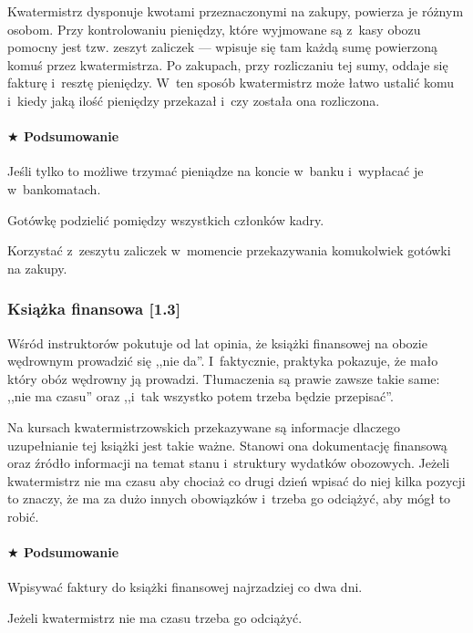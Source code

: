 \documentclass[a5paper,10pt,titlepage,twoside]{article}
\newcommand*{\thecheckbox}{\hss$\Box$} %
\newenvironment*{checklist}
{\list{}{%
\renewcommand*{\makelabel}[1]{\thecheckbox}}}
{\endlist}
\begin{document}
Kwatermistrz dysponuje kwotami przeznaczonymi na zakupy, powierza je różnym osobom. Przy kontrolowaniu pieniędzy, które wyjmowane są z~kasy obozu pomocny jest tzw. zeszyt zaliczek --- wpisuje się tam każdą sumę powierzoną komuś przez kwatermistrza. Po zakupach, przy rozliczaniu tej sumy, oddaje się fakturę i~resztę pieniędzy. W~ten sposób kwatermistrz może łatwo ustalić komu i~kiedy jaką ilość pieniędzy przekazał i~czy została ona rozliczona.
\paragraph{$\bigstar$ Podsumowanie}
\begin{checklist}
\item Jeśli tylko to możliwe trzymać pieniądze na koncie w~banku i~wypłacać je w~bankomatach.
\item Gotówkę podzielić pomiędzy wszystkich członków kadry.
\item Korzystać z~zeszytu zaliczek w~momencie przekazywania komukolwiek gotówki na zakupy.
\end{checklist}
\subsubsection{Książka finansowa [1.3]}
Wśród instruktorów pokutuje od lat opinia, że książki finansowej na obozie wędrownym prowadzić się ,,nie da''. I~faktycznie, praktyka pokazuje, że mało który obóz wędrowny ją prowadzi. Tłumaczenia są prawie zawsze takie same: ,,nie ma czasu'' oraz ,,i~tak wszystko potem trzeba będzie przepisać''.

Na kursach kwatermistrzowskich przekazywane są informacje dlaczego uzupełnianie tej książki jest takie ważne. Stanowi ona dokumentację finansową oraz źródło informacji na temat stanu i~struktury wydatków obozowych. Jeżeli kwatermistrz nie ma czasu aby chociaż co drugi dzień wpisać do niej kilka pozycji to znaczy, że ma za dużo innych obowiązków i~trzeba go odciążyć, aby mógł to robić.
\paragraph{$\bigstar$ Podsumowanie}
\begin{checklist}
\item Wpisywać faktury do książki finansowej najrzadziej co dwa dni.
\item Jeżeli kwatermistrz nie ma czasu trzeba go odciążyć.
\end{checklist}
\end{document}
